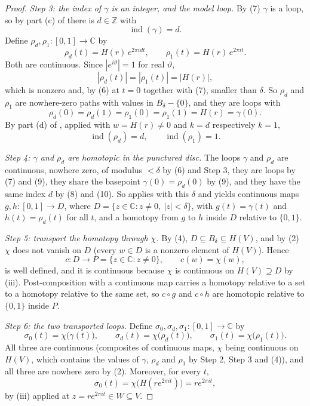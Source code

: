 \begin{proof}
\emph{Step 3: the index of $\gamma$ is an integer, and the model loop.}  By (7)
$\gamma$ is a loop, so by part (c) of  there is
$d\in\mathbb{Z}$ with
\begin{equation}\tag{8}
  \operatorname{ind}(\gamma)=d .
\end{equation}
Define $\rho_d,\rho_1\colon[0,1]\to\mathbb{C}$ by
\[
  \rho_d(t)=H(r)\,e^{2\pi idt},\qquad \rho_1(t)=H(r)\,e^{2\pi it}.
\]
Both are continuous.  Since $|e^{i\vartheta}|=1$ for real $\vartheta$,
\[
  |\rho_d(t)|=|\rho_1(t)|=|H(r)|,
\]
which is nonzero and, by (6) at $t=0$ together with (7), smaller than $\delta$.
So $\rho_d$ and $\rho_1$ are nowhere-zero paths with values in
$B_\delta-\{0\}$, and they are loops with
\begin{equation}\tag{9}
  \rho_d(0)=\rho_d(1)=\rho_1(0)=\rho_1(1)=H(r)=\gamma(0).
\end{equation}
By part (d) of , applied with $w=H(r)\neq0$ and $k=d$
respectively $k=1$,
\begin{equation}\tag{10}
  \operatorname{ind}(\rho_d)=d,\qquad \operatorname{ind}(\rho_1)=1 .
\end{equation}

\emph{Step 4: $\gamma$ and $\rho_d$ are homotopic in the punctured disc.}  The
loops $\gamma$ and $\rho_d$ are continuous, nowhere zero, of modulus $<\delta$
by (6) and Step 3, they are loops by (7) and (9), they share the basepoint
$\gamma(0)=\rho_d(0)$ by (9), and they have the same index $d$ by (8) and (10).
So  applies with this $\delta$ and yields continuous
maps $g,h\colon[0,1]\to D$, where
$D=\{z\in\mathbb{C}:z\neq0,\ |z|<\delta\}$, with $g(t)=\gamma(t)$ and
$h(t)=\rho_d(t)$ for all $t$, and a homotopy from $g$ to $h$ inside $D$
relative to $\{0,1\}$.

\emph{Step 5: transport the homotopy through $\chi$.}  By (4),
$D\subseteq B_\delta\subseteq H(V)$, and by (2) $\chi$ does not vanish on $D$
(every $w\in D$ is a nonzero element of $H(V)$).  Hence
\[
  c\colon D\to P=\{z\in\mathbb{C}:z\neq0\},\qquad c(w)=\chi(w),
\]
is well defined, and it is continuous because $\chi$ is continuous on
$H(V)\supseteq D$ by (iii).  Post-composition with a continuous map carries a
homotopy relative to a set to a homotopy relative to the same set, so
$c\circ g$ and $c\circ h$ are homotopic relative to $\{0,1\}$ inside $P$.

\emph{Step 6: the two transported loops.}  Define
$\sigma_0,\sigma_d,\sigma_1\colon[0,1]\to\mathbb{C}$ by
\[
  \sigma_0(t)=\chi\bigl(\gamma(t)\bigr),\qquad
  \sigma_d(t)=\chi\bigl(\rho_d(t)\bigr),\qquad
  \sigma_1(t)=\chi\bigl(\rho_1(t)\bigr).
\]
All three are continuous (composites of continuous maps, $\chi$ being
continuous on $H(V)$, which contains the values of $\gamma$, $\rho_d$ and
$\rho_1$ by Step 2, Step 3 and (4)), and all three are nowhere zero by (2).
Moreover, for every $t$,
\begin{equation}\tag{11}
  \sigma_0(t)=\chi\bigl(H(re^{2\pi it})\bigr)=re^{2\pi it},
\end{equation}
by (iii) applied at $z=re^{2\pi it}\in W\subseteq V$.


\end{proof}
